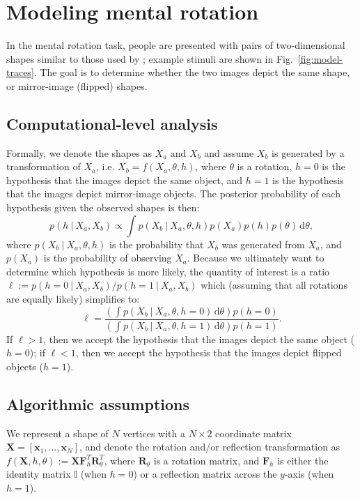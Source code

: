 \documentclass[10pt,letterpaper]{article}
\newcommand{\R}[0]{\mathbf{R}_\theta}
\newcommand{\F}[0]{\mathbf{F}}
\newcommand{\I}[0]{\mathbb{I}}
\newcommand{\hi}[0]{h=0}
\newcommand{\hf}[0]{h=1}
\newcommand{\dif}[0]{\,\mathrm{d}}
\begin{document}
\section{Modeling mental rotation}

In the mental rotation task, people are presented with pairs of
two-dimensional shapes similar to those used by ;
example stimuli are shown in Fig.~\ref{fig:model-traces}. The goal is
to determine whether the two images depict the same shape, or
mirror-image (flipped) shapes.

\subsection{Computational-level analysis}

Formally, we denote the shapes as $X_a$ and $X_b$ and assume $X_b$ is
generated by a transformation of $X_a$, i.e. $X_b=f(X_a, \theta, h)$,
where $\theta$ is a rotation, $\hi$ is the hypothesis that the images
depict the same object, and $\hf$ is the hypothesis that the images
depict mirror-image objects. The posterior probability of each
hypothesis given the observed shapes is then:
\begin{equation}
  p(h\ \vert\ X_a, X_b) \propto \int p(X_b\ \vert\ X_a, \theta, h)p(X_a)p(h)p(\theta)\dif\theta,
  \label{eq:posterior}
\end{equation}
where $p(X_b\ \vert\ X_a, \theta, h)$ is the probability that $X_b$
was generated from $X_a$, and $p(X_a)$ is the probability of observing
$X_a$. Because we ultimately want to determine which hypothesis is
more likely, the quantity of interest is a ratio $\ell:=p(\hi\ \vert\
X_a, X_b) / p(\hf\ \vert\ X_a, X_b)$ which (assuming that all
rotations are equally likely) simplifies to:
\begin{equation}
  \ell = \frac{\left(\int p(X_b\ \vert\ X_a, \theta, \hi)\dif\theta\right)p(\hi)}{\left(\int p(X_b\ \vert\ X_a, \theta, \hf)\dif\theta\right)p(\hf)}.
  \label{eq:lh-ratio}
\end{equation}
If $\ell > 1$, then we accept the hypothesis that the images depict
the same object ($\hi$); if $\ell < 1$, then we accept the hypothesis
that the images depict flipped objects ($\hf$).

\subsection{Algorithmic assumptions}

We represent a shape of $N$ vertices with a $N\times 2$ coordinate
matrix $\mathbf{X}=[\mathbf{x}_1, \ldots{}, \mathbf{x}_N]$, and denote
the rotation and/or reflection transformation as $f(\mathbf{X}, h,
\theta):=\mathbf{X}\F_h^T\R^T$, where $\R$ is a rotation matrix, and
$\F_h$ is either the identity matrix $\I$ (when $\hi$) or a reflection
matrix across the $y$-axis (when $\hf$).
\end{document}
